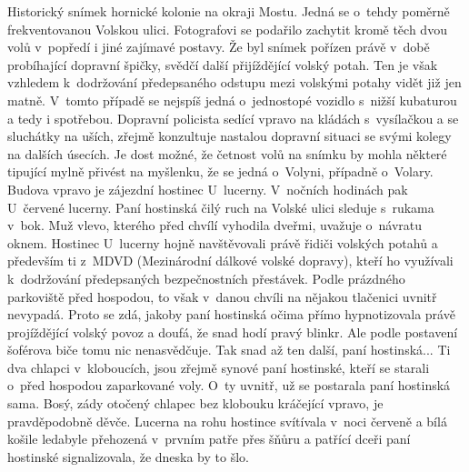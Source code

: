 
Historický snímek hornické kolonie na okraji Mostu. Jedná se o~tehdy
poměrně frekventovanou Volskou ulici. Fotografovi se podařilo zachytit
kromě těch dvou volů v~popředí i jiné zajímavé postavy. Že byl snímek
pořízen právě v~době probíhající dopravní špičky, svědčí další
přijíždějící volský potah. Ten je však vzhledem k~dodržování
předepsaného odstupu mezi volskými potahy vidět již jen matně. V~tomto
případě se nejspíš jedná o~jednostopé vozidlo s~nižší kubaturou a tedy
i spotřebou. Dopravní policista sedící vpravo na kládách s~vysílačkou
a se sluchátky na uších, zřejmě konzultuje nastalou dopravní situaci
se svými kolegy na dalších úsecích. Je dost možné, že četnost volů na
snímku by mohla některé tipující mylně přivést na myšlenku, že se
jedná o~Volyni, případně o~Volary. Budova vpravo je zájezdní hostinec
U~lucerny. V~nočních hodinách pak U~červené lucerny. Paní hostinská
čilý ruch na Volské ulici sleduje s~rukama v~bok. Muž vlevo, kterého
před chvílí vyhodila dveřmi, uvažuje o~návratu oknem. Hostinec
U~lucerny hojně navštěvovali právě řidiči volských potahů a především
ti z~MDVD (Mezinárodní dálkové volské dopravy), kteří ho využívali
k~dodržování předepsaných bezpečnostních přestávek. Podle prázdného
parkoviště před hospodou, to však v~danou chvíli na nějakou tlačenici
uvnitř nevypadá. Proto se zdá, jakoby paní hostinská očima přímo
hypnotizovala právě projíždějící volský povoz a doufá, že snad hodí
pravý blinkr. Ale podle postavení šoférova biče tomu nic nenasvědčuje.
Tak snad až ten další, paní hostinská... Ti dva chlapci v~kloboucích,
jsou zřejmě synové paní hostinské, kteří se starali o~před hospodou
zaparkované voly. O~ty uvnitř, už se postarala paní hostinská sama.
Bosý, zády otočený chlapec bez klobouku kráčející vpravo, je
pravděpodobně děvče. Lucerna na rohu hostince svítívala v~noci červeně
a bílá košile ledabyle přehozená v~prvním patře přes šňůru a patřící
dceři paní hostinské signalizovala, že dneska by to šlo.
